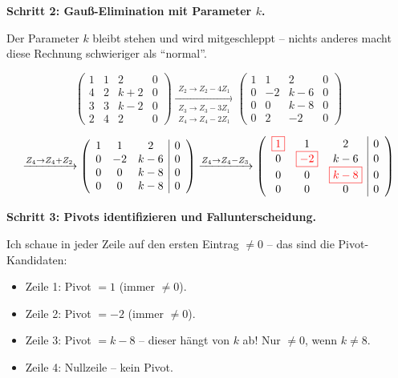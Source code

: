 \documentclass[a4paper,12pt]{article}
\newcommand{\piv}[1]{{\color{red}\boxed{#1}}}
\begin{document}
\textbf{Schritt 2: Gau\ss-Elimination mit Parameter $k$.}

Der Parameter $k$ bleibt stehen und wird mitgeschleppt -- nichts anderes macht diese Rechnung
schwieriger als ``normal''.

\[
\left(\begin{array}{ccc|c}
1 & 1 & 2 & 0 \\
4 & 2 & k+2 & 0 \\
3 & 3 & k-2 & 0 \\
2 & 4 & 2 & 0
\end{array}\right)
\xrightarrow[\substack{Z_3 \to Z_3 - 3Z_1 \\ Z_4 \to Z_4 - 2Z_1}]{Z_2 \to Z_2 - 4Z_1}
\left(\begin{array}{ccc|c}
1 & 1 & 2 & 0 \\
0 & -2 & k-6 & 0 \\
0 & 0 & k-8 & 0 \\
0 & 2 & -2 & 0
\end{array}\right)
\]

\[
\xrightarrow{Z_4 \to Z_4 + Z_2}
\left(\begin{array}{ccc|c}
1 & 1 & 2 & 0 \\
0 & -2 & k-6 & 0 \\
0 & 0 & k-8 & 0 \\
0 & 0 & k-8 & 0
\end{array}\right)
\xrightarrow{Z_4 \to Z_4 - Z_3}
\left(\begin{array}{ccc|c}
\piv{1} & 1 & 2 & 0 \\
0 & \piv{-2} & k-6 & 0 \\
0 & 0 & \piv{k-8} & 0 \\
0 & 0 & 0 & 0
\end{array}\right)
\]

\textbf{Schritt 3: Pivots identifizieren und Fallunterscheidung.}

Ich schaue in jeder Zeile auf den ersten Eintrag $\neq 0$ -- das sind die Pivot-Kandidaten:

\begin{itemize}[leftmargin=*, nosep]
\item Zeile 1: Pivot $= 1$ (immer $\neq 0$). \checkmark
\item Zeile 2: Pivot $= -2$ (immer $\neq 0$). \checkmark
\item Zeile 3: Pivot $= k-8$ -- dieser h\"angt von $k$ ab! Nur $\neq 0$, wenn $k \neq 8$.
\item Zeile 4: Nullzeile -- kein Pivot.
\end{itemize}
\end{document}
